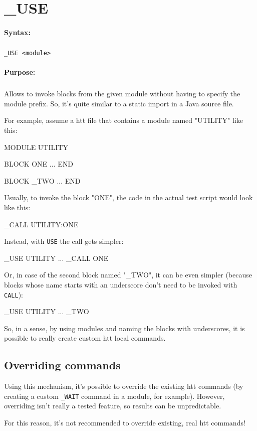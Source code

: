 
\newpage
\section{\_USE}
\label{cmd:USE}

\paragraph{Syntax:}
\subparagraph{}
\texttt{\_USE <module>}

\paragraph{Purpose:}
\subparagraph{}
Allows to invoke blocks from the given module without 
having to specify the module prefix. So, it's quite 
similar to a static import in a Java source file.

For example, assume a htt file that contains a module 
named "UTILITY" like this:

\begin{usplisting}
    MODULE UTILITY

    BLOCK ONE
    ...
    END

    BLOCK _TWO
    ...
    END
\end{usplisting}

Usually, to invoke the block "ONE", the code in the 
actual test script would look like this:

\begin{usplisting}
    _CALL UTILITY:ONE
\end{usplisting}

Instead, with \texttt{USE} the call gets simpler:

\begin{usplisting}
    _USE UTILITY
    ...
    _CALL ONE
\end{usplisting}

\newpage
Or, in case of the second block named "\_TWO", it can 
be even simpler (because blocks whose name starts with 
an underscore don't need to be invoked with \texttt{CALL}):

\begin{usplisting}
    _USE UTILITY
    ...
    _TWO
\end{usplisting}

So, in a sense, by using modules and naming the blocks with 
underscores, it is possible to really create custom htt local 
commands.

\subsection{Overriding commands}

Using this mechanism, it's possible to override the existing 
htt commands (by creating a custom \texttt{\_WAIT} command in 
a module, for example). However, overriding isn't really a 
tested feature, so results can be unpredictable.

For this reason, it's not recommended to override existing, 
real htt commands!